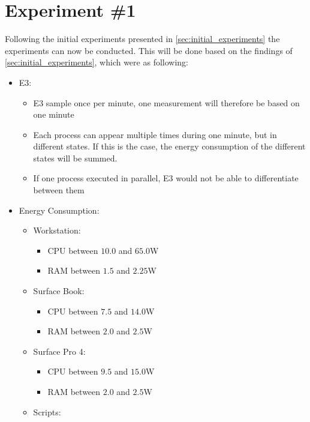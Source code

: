 \section{Experiment \#1}\label{sec:experiment_one}

Following the initial experiments presented in \cref{sec:initial_experiments} the experiments can now be conducted. This will be done based on the findings of \cref{sec:initial_experiments}, which were as following:

\begin{itemize}
    \item E3:
    \begin{itemize}
        \item E3 sample once per minute, one measurement will therefore be based on one minute
        \item Each process can appear multiple times during one minute, but in different states. If this is the case, the energy consumption of the different states will be summed.
        \item If one process executed in parallel, E3 would not be able to differentiate between them
    \end{itemize}
    \item Energy Consumption:
    \begin{itemize}
        \item Workstation: 
        \begin{itemize}
            \item CPU between $10.0$ and $65.0$W
            \item RAM between $1.5$ and $2.25$W
        \end{itemize}
        \item Surface Book: 
        \begin{itemize}
            \item CPU between $7.5$ and $14.0$W
            \item RAM between $2.0$ and $2.5$W
        \end{itemize}
        \item Surface Pro 4: 
        \begin{itemize}
            \item CPU between $9.5$ and $15.0$W
            \item RAM between $2.0$ and $2.5$W
        \end{itemize}
        \item Scripts:
        \begin{itemize}

\end{itemize}
\end{itemize}
\end{itemize}
